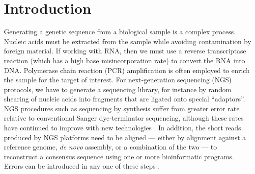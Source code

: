 \documentclass[12pt]{article}
\begin{document}
\doublespacing
\pagewiselinenumbers

\section{Introduction}

Generating a genetic sequence from a biological sample is a complex process.
Nucleic acids must be extracted from the sample while avoiding contamination by foreign material.
If working with RNA, then we must use a reverse transcriptase reaction (which has a high base misincorporation rate) to convert the RNA into DNA. 
Polymerase chain reaction (PCR) amplification is often employed to enrich the sample for the target of interest.
For next-generation sequencing (NGS) protocols, we have to generate a sequencing library, for instance by random shearing of nucleic acids into fragments that are ligated onto special ``adaptors''.
NGS procedures such as sequencing by synthesis suffer from greater error rate relative to conventional Sanger dye-terminator sequencing, although these rates have continued to improve with new technologies \cite{fullerChallengesSequencingSynthesis2009, goodwinComingAgeTen2016, salkEnhancingAccuracyNextgeneration2018}. 
In addition, the short reads produced by NGS platforms need to be aligned --- either by alignment against a reference genome, \emph{de novo} assembly, or a combination of the two --- to reconstruct a consensus sequence using one or more bioinformatic programs.
Errors can be introduced in any one of these steps \cite{beerenwinkelUltradeepSequencingAnalysis2011, oraweAccountingUncertaintyDNA2015}.
\end{document}
